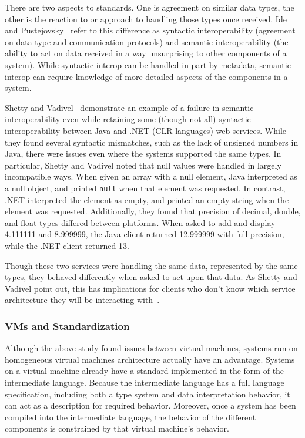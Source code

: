 \documentclass{sig-alternate}
\begin{document}
There are two aspects to standards. One is agreement on similar data types, the other is the reaction to or approach to handling those types once received. Ide and Pustejovsky~\cite{Ide:2010} refer to this difference as syntactic interoperability (agreement on data type and communication protocols) and semantic interoperability (the ability to act on data received in a way unsurprising to other components of a system). While syntactic interop can be handled in part by metadata, semantic interop can require knowledge of more detailed aspects of the components in a system.

Shetty and Vadivel~\cite{Shetty:2009} demonstrate an example of a failure in semantic interoperability even while retaining some (though not all) syntactic interoperability between Java and .NET (CLR languages) web services.
While they found several syntactic mismatches, such as the lack of unsigned numbers in Java, there were issues even where the systems supported the same types. In particular, Shetty and Vadivel noted that null values were handled in largely incompatible ways. When given an array with a null element, Java interpreted as a null object, and printed {\tt null} when that element was requested. In contrast, .NET interpreted the element as empty, and printed an empty string when the element was requested. 
Additionally, they found that precision of decimal, double, and float types differed between platforms. When asked to add and display 4.111111 and 8.999999, the Java client returned 12.999999 with full precision, while the .NET client returned 13.

Though these two services were handling the same data, represented by the same types, they behaved differently \linebreak
 when asked to act upon that data. As Shetty and Vadivel point out, this has implications for clients who don't know which service architecture they will be interacting with~\cite{Shetty:2009}.


\subsubsection*{VMs and Standardization}
Although the above study found issues between virtual machines, systems run on homogeneous virtual machines architecture actually have an advantage. Systems on a virtual machine already have a standard implemented in the form of the intermediate language. Because the intermediate language has a full language specification, including both a type system and data interpretation behavior, it can act as a description for required behavior. Moreover, once a system has been compiled into the intermediate language, the behavior of the different components is constrained by that virtual machine's behavior.
\end{document}
